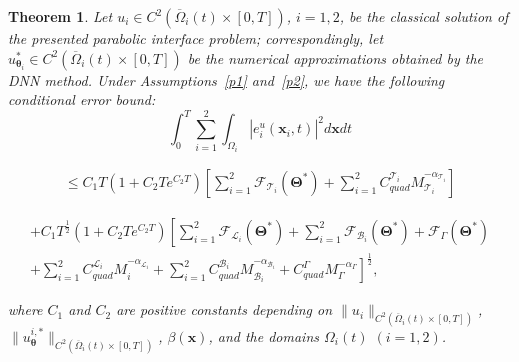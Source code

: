 \documentclass[10pt,a4paper]{amsart}
\newtheorem{theorem}{Theorem}
\begin{document}
\begin{theorem}
Let $u_i \in C^2(\overline{\Omega}_i(t) \times [0, T])$, $i = 1, 2$, be the classical solution of the presented parabolic interface problem; correspondingly, let $u_{\boldsymbol{\theta}_i}^{*} \in C^2(\overline{\Omega}_i(t) \times [0, T])$ be the numerical approximations obtained by the DNN method. Under Assumptions~\ref{p1} and~\ref{p2}, we have the following conditional error bound:
\begin{equation}
\int_{0}^{T} \sum_{i=1}^{2} \int_{\Omega_i} |e_i^u(\boldsymbol{x}_i, t)|^2 d\boldsymbol{x}dt
\end{equation}

\begin{align}
\leq C_1 T(1+C_2Te^{C_2T}) \left[ \sum_{i=1}^{2} \mathcal{F}_{\mathcal{T}_i}(\boldsymbol{\Theta}^*) + \sum_{i=1}^{2} C_{quad}^{\mathcal{T}_i}M_{\mathcal{T}_i}^{-\alpha_{\mathcal{T}_i}} \right]
\end{align}

\begin{align}
+ C_1 T^{\frac{1}{2}}(1+C_2Te^{C_2T}) \left[ \sum_{i=1}^{2} \mathcal{F}_{\mathcal{L}_i}(\boldsymbol{\Theta}^*) + \sum_{i=1}^{2} \mathcal{F}_{\mathcal{B}_i}(\boldsymbol{\Theta}^*) + \mathcal{F}_{\Gamma}(\boldsymbol{\Theta}^*) \right.\\
\left. + \sum_{i=1}^{2} C_{quad}^{\mathcal{L}_i}M_{i}^{-\alpha_{\mathcal{L}_i}} + \sum_{i=1}^{2} C_{quad}^{\mathcal{B}_i}M_{\mathcal{B}_i}^{-\alpha_{\mathcal{B}_i}} + C_{quad}^{\Gamma}M_{\Gamma}^{-\alpha_{\Gamma}} \right]^{\frac{1}{2}},
\end{align}

where $C_1$ and $C_2$ are positive constants depending on $\|u_i\|_{C^2(\overline{\Omega}_i(t) \times [0,T])}$, $\|u_{\boldsymbol{\theta}}^{i,*}\|_{C^2(\overline{\Omega}_i(t) \times [0,T])}$, $\beta(\boldsymbol{x})$, and the domains $\Omega_i(t)$ $(i = 1, 2)$.
\end{theorem}
\end{document}
